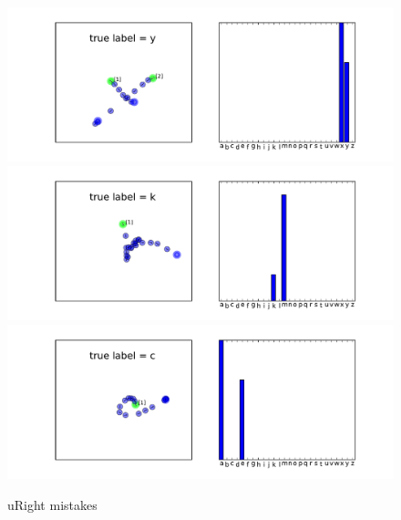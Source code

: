 \documentclass{article}
\begin{document}
\begin{figure}[ht]
\vskip 0.2in
\begin{center}
\centering
  \includegraphics[width=.95\linewidth]{figures/icml-uright-interesting-134.pdf}\\
  \includegraphics[width=.95\linewidth]{figures/icml-uright-interesting-70.pdf}\\
  \includegraphics[width=.95\linewidth]{figures/icml-uright-interesting-248.pdf}\\
  \caption{uRight mistakes}
  \label{fig:uright-mistakes}
\end{center}
\vskip -0.2in
\end{figure}
\end{document}
